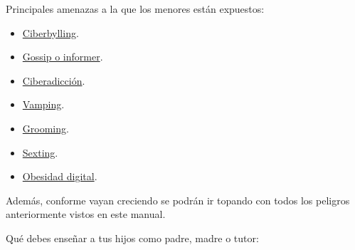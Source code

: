 \documentclass[
  a4paper,
  openany]{book}
\begin{document}
Principales amenazas a la que los menores están expuestos:

\begin{itemize}
\item
  \href{https://ayudaenaccion.org/ong/blog/educacion/ciberbullying/}{Ciberbylling}.
\item
  \href{https://educacion2.com/que-es-el-fenomeno-gossip-e-informer/}{Gossip o informer}.
\item
  \href{https://www.aepap.org/sites/default/files/pags._131-142_ciberadicciones.pdf}{Ciberadicción}.
\item
  \href{https://www.educapeques.com/escuela-de-padres/vamping-definicion.html}{Vamping}.
\item
  \href{https://www.is4k.es/necesitas-saber/grooming}{Grooming}.
\item
  \href{https://www.is4k.es/menores-y-sexting}{Sexting}.
\item
  \href{https://www.levantalacabeza.es/obesidad-digital/}{Obesidad digital}.
\end{itemize}

Además, conforme vayan creciendo se podrán ir topando con todos los peligros anteriormente vistos en este manual.

Qué debes enseñar a tus hijos como padre, madre o tutor:
\end{document}
